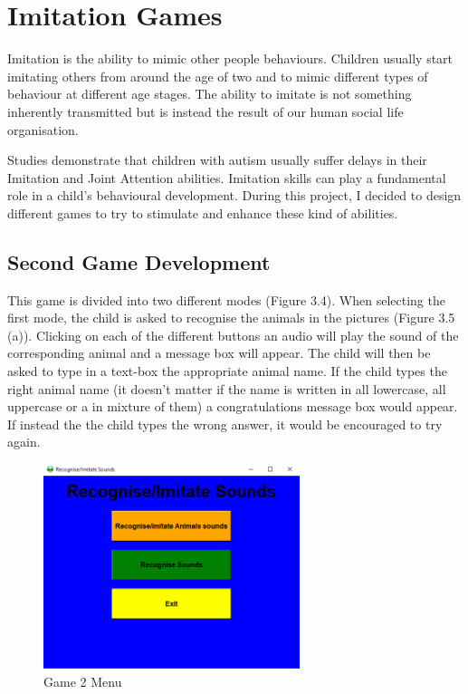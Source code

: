 \section{Imitation Games}
Imitation is the ability to mimic other people behaviours. Children usually start imitating others from around the age of two and to mimic different types of behaviour at different age stages. The ability to imitate is not something inherently transmitted but is instead the result of our human social life organisation.

Studies demonstrate that children with autism usually suffer delays in their Imitation and Joint Attention abilities. Imitation skills can play a fundamental role in a child's behavioural development. During this project, I decided to design different games to try to stimulate and enhance these kind of abilities.

\subsection{Second Game Development}
This game is divided into two different modes (Figure 3.4). When selecting the first mode, the child is asked to recognise the animals in the pictures (Figure 3.5 (a)). Clicking on each of the different buttons an audio will play the sound of the corresponding animal and a message box will appear. The child will then be asked to type in a text-box the appropriate animal name. If the child types the right animal name (it doesn't matter if the name is written in all lowercase, all uppercase or a in mixture of them) a congratulations message box would appear. If instead the the child types the wrong answer, it would be encouraged to try again.

\begin{figure}[ht!]%
    \centering
    \includegraphics[width=7.5cm]{images/game4menu.PNG}%
    \caption{Game 2 Menu}
\end{figure}

